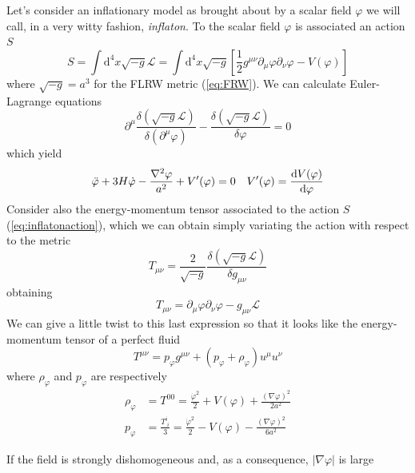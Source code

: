 Let's consider an inflationary model as brought about by a scalar field $\varphi$ we will call, in a very witty fashion, \emph{inflaton}. To the scalar field $\varphi$ is associated an action $S$
\begin{equation}
    S = \int \text{d}^{4}x \sqrt{-g}\mathcal{L} = \int \text{d}^{4}x \sqrt{-g}\left[\frac{1}{2}g^{\mu\nu}\partial_{\mu}\varphi\partial_{\nu}\varphi - V(\varphi)\right]
    \label{eq:inflatonaction}
\end{equation}
where $\sqrt{-g} = a^{3}$ for the FLRW metric (\ref{eq:FRW}). We can calculate Euler-Lagrange equations
\begin{equation}
    \partial^{\mu}\frac{\delta(\sqrt{-g}\mathcal{L})}{\delta(\partial^{\mu}\varphi)} - \frac{\delta(\sqrt{-g}\mathcal{L})}{\delta\varphi} = 0
\end{equation}
which yield 
\begin{equation}
    \ddot{\varphi} + 3H\dot{\varphi} - \frac{\nabla^{2}\varphi}{a^{2}}+V'(\varphi) = 0 \quad V'(\varphi) = \frac{\text{d}V(\varphi)}{\text{d}\varphi}
\end{equation}
Consider also the energy-momentum tensor associated to the action $S$ (\ref{eq:inflatonaction}), which we can obtain simply variating the action with respect to the metric 
\begin{equation}
    T_{\mu\nu} = \frac{2}{\sqrt{-g}}\frac{\delta(\sqrt{-g}\mathcal{L})}{\delta g_{\mu\nu}}
    \label{eq:generalemtensor}
\end{equation}
obtaining
\begin{equation}
    T_{\mu\nu} = \partial_{\mu}\varphi\partial_{\nu}\varphi -g_{\mu\nu}\mathcal{L}
\end{equation}
We can give a little twist to this last expression so that it looks like the energy-momentum tensor of a perfect fluid 
\begin{equation}
    T^{\mu\nu} = p_{\varphi}g^{\mu\nu} + (p_{\varphi}+\rho_{\varphi})u^{\mu}u^{\nu}
\end{equation}
where $\rho_{\varphi}$ and $p_{\varphi}$ are respectively
\begin{align}
    \rho_{\varphi} &= T^{00} = \frac{\dot{\varphi}^{2}}{2} + V(\varphi) + \frac{(\nabla\varphi)^{2}}{2a^{2}}\\
    p_{\varphi} &= \frac{T^{i}_{\;i}}{3} = \frac{\dot{\varphi}^{2}}{2}-V(\varphi)-\frac{(\nabla\varphi)^{2}}{6a^{2}}
\end{align}
\par If the field is strongly dishomogeneous and, as a consequence, $|\nabla\varphi|$ is large
